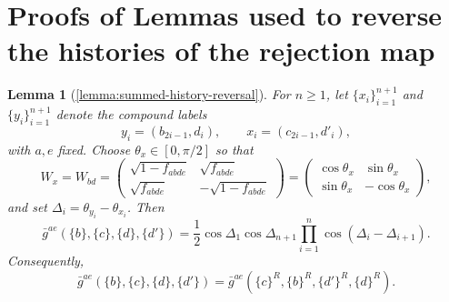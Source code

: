 \documentclass[aps,floatfix,10pt,amssymb,amsfont,amsmath,superscriptaddress,float,nofootinbib,longbibliography,nobalancelastpage,twocolumn]{revtex4-2}
\newtheorem*{lemma*}{Lemma}
\begin{document}
\section{Proofs of Lemmas used to reverse the histories of the rejection map}
\label{section:appendixHist}
\begin{lemma*}[\ref{lemma:summed-history-reversal}]
For $n\geq1$, let $\{x_i\}_{i=1}^{n+1}$ and $\{y_i\}_{i=1}^{n+1}$ denote
the compound labels
\begin{equation*}
    y_i=(b_{2i-1},d_i),\qquad x_i=(c_{2i-1},d'_i),
\end{equation*}
with $a,e$ fixed.  Choose $\theta_x\in[0,\pi/2]$ so that
\begin{equation*}
    W_x=W_{bd}=\begin{pmatrix}
                \sqrt{1 - f_{abde}} & \sqrt{f_{abde}}\\
       \sqrt{f_{abde}} & -\sqrt{1 - f_{abde}}
    \end{pmatrix}= \begin{pmatrix}\cos\theta_x&\sin\theta_x\\
    \sin\theta_x&-\cos\theta_x\end{pmatrix},
\end{equation*}
and set $\Delta_i=\theta_{y_i}-\theta_{x_i}$.  Then
\begin{equation}
    \bar g^{ae}(\{b\},\{c\},\{d\},\{d'\})
    =\frac12\cos\Delta_1\cos\Delta_{n+1}
      \prod_{i=1}^{n}\cos(\Delta_i-\Delta_{i+1}).
\end{equation}
Consequently,
\begin{equation}
    \bar g^{ae}(\{b\},\{c\},\{d\},\{d'\})
    =\bar g^{ae}(\{c\}^R,\{b\}^R,\{d'\}^R,\{d\}^R).
    \label{eq:PRRrestated}
\end{equation}
\end{lemma*}
\end{document}
